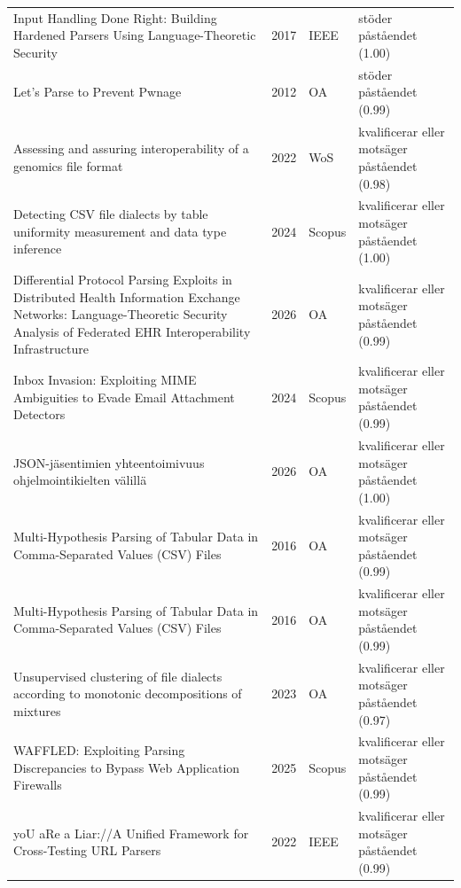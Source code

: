 \begin{longtable}{@{}%
  >{\raggedright\arraybackslash}p{}c%
  >{\raggedright\arraybackslash}p{}%
  >{\raggedright\arraybackslash}p{}@{}}
Input Handling Done Right: Building Hardened Parsers Using Language-Theoretic Security & 2017 & IEEE & stöder påståendet (1.00) \\
Let's Parse to Prevent Pwnage & 2012 & OA & stöder påståendet (0.99) \\
Assessing and assuring interoperability of a genomics file format & 2022 & WoS & kvalificerar eller motsäger påståendet (0.98) \\
Detecting CSV file dialects by table uniformity measurement and data type inference & 2024 & Scopus & kvalificerar eller motsäger påståendet (1.00) \\
Differential Protocol Parsing Exploits in Distributed Health Information Exchange Networks: Language-Theoretic Security Analysis of Federated EHR Interoperability Infrastructure & 2026 & OA & kvalificerar eller motsäger påståendet (0.99) \\
Inbox Invasion: Exploiting MIME Ambiguities to Evade Email Attachment Detectors & 2024 & Scopus & kvalificerar eller motsäger påståendet (0.99) \\
JSON-jäsentimien yhteentoimivuus ohjelmointikielten välillä & 2026 & OA & kvalificerar eller motsäger påståendet (1.00) \\
Multi-Hypothesis Parsing of Tabular Data in Comma-Separated Values (CSV) Files & 2016 & OA & kvalificerar eller motsäger påståendet (0.99) \\
Multi-Hypothesis Parsing of Tabular Data in Comma-Separated Values (CSV) Files & 2016 & OA & kvalificerar eller motsäger påståendet (0.99) \\
Unsupervised clustering of file dialects according to monotonic decompositions of mixtures & 2023 & OA & kvalificerar eller motsäger påståendet (0.97) \\
WAFFLED: Exploiting Parsing Discrepancies to Bypass Web Application Firewalls & 2025 & Scopus & kvalificerar eller motsäger påståendet (0.99) \\
yoU aRe a Liar://A Unified Framework for Cross-Testing URL Parsers & 2022 & IEEE & kvalificerar eller motsäger påståendet (0.99) \\
\end{longtable}
\endgroup
